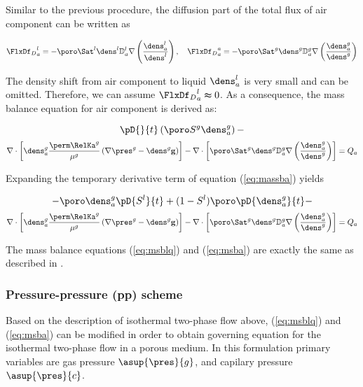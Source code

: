 Similar to the previous procedure, the diffusion part of the total flux of air component can be written as

\begin{align}
{{\FlxDf}_D}_a^{l}=-\poro \Sat^{l}  \dens^{l} {\mathbb D}_a^{l} \nabla \left(\dfrac{\dens_a^{l}}{\dens^{l}}\right),\quad
{{\FlxDf}_D}_a^{a}=-\poro \Sat^{g}  \dens^{g} {\mathbb D}_a^{g} \nabla \left(\dfrac{\dens_a^{g}}{\dens^{g}}\right)
\label{eq:flx_fka}
\end{align}

The density shift from air component to liquid ${\dens_a^{l}}$ is very small and can be omitted. Therefore, we can assume ${{\FlxDf}_D}_a^{l}\thickapprox0$. As a consequence, the mass balance equation for air component is derived as:

$$\pD{}{t} \left(\poro S^g\dens_a^g\right) -$$
\begin{align}
\nabla \cdot \left[\dens_a^{g}\dfrac{\perm \RelKa^{g}}{\mu^{g}}\left(\nabla \pres^{g}-\dens^{g} \mathbf g\right)\right]-\nabla \cdot \left[\poro \Sat^{g}  \dens^{g} {\mathbb D}_a^{g} \nabla \left(\dfrac{\dens_a^{g}}{\dens^{g}}\right)\right] =Q_a
\label{eq:massba}
\end{align}

Expanding the temporary derivative term of equation (\ref{eq:massba}) yields

$$-\poro \dens_a^g \pD{S^l}{t} + (1 -S^l)\poro \pD{\dens_a^{g}}{t}-$$
\begin{align}
\nabla \cdot \left[\dens_a^{g}\dfrac{\perm \RelKa^{g}}{\mu^{g}}\left(\nabla \pres^{g}-\dens^{g} \mathbf g\right)\right] -
\nabla \cdot \left[\poro \Sat^{g} \dens^{g} {\mathbb D}_a^{g} \nabla \left(\dfrac{\dens_a^{g}}{\dens^{g}}\right)\right] = Q_a
\label{eq:msba}
\end{align}

The mass balance equations (\ref{eq:msblq}) and (\ref{eq:msba}) are exactly the same as described in \cite{SanPesSch:06}.

\subsubsection*{Pressure-pressure (pp) scheme}
Based on the description of isothermal two-phase flow above, (\ref{eq:msblq}) and (\ref{eq:msba}) can be modified in order to obtain governing equation for the isothermal two-phase flow in a porous medium. In this formulation primary variables are gas pressure $\asup{\pres}{g}$, and capilary pressure $\asup{\pres}{c}$.

